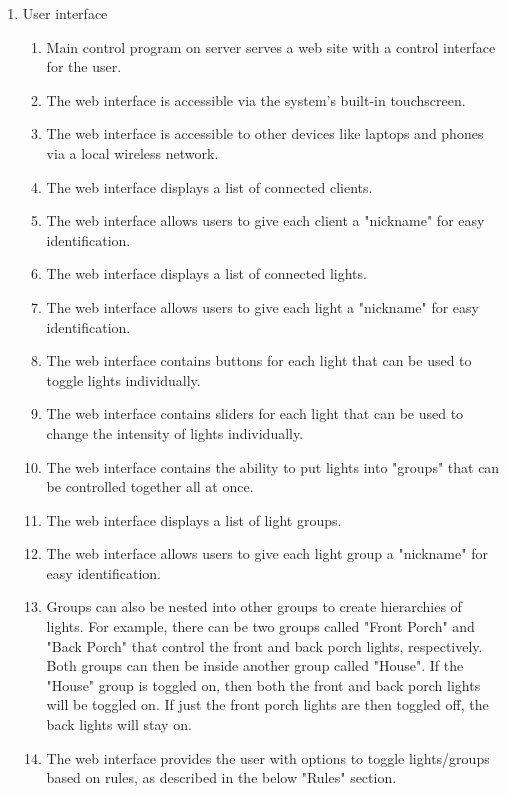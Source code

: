 \documentclass[12pt]{article}
\begin{document}
\begin{enumerate}
    \item User interface
        \begin{enumerate}
            \item Main control program on server serves a web site with a control interface for the user.
            \item The web interface is accessible via the system's built-in touchscreen.
            \item The web interface is accessible to other devices like laptops and phones via a local wireless network.
            \item The web interface displays a list of connected clients.
            \item The web interface allows users to give each client a "nickname" for easy identification.
            \item The web interface displays a list of connected lights.
            \item The web interface allows users to give each light a "nickname" for easy identification.
            \item The web interface contains buttons for each light that can be used to toggle lights individually.
            \item The web interface contains sliders for each light that can be used to change the intensity of lights individually.
            \item The web interface contains the ability to put lights into "groups" that can be controlled together all at once.
            \item The web interface displays a list of light groups.
            \item The web interface allows users to give each light group a "nickname" for easy identification.
            \item Groups can also be nested into other groups to create hierarchies of lights.  For example, there can be two groups called "Front Porch" and "Back Porch" that control the front and back porch lights, respectively.  Both groups can then be inside another group called "House".  If the "House" group is toggled on, then both the front and back porch lights will be toggled on.  If just the front porch lights are then toggled off, the back lights will stay on.
            \item The web interface provides the user with options to toggle lights/groups based on rules, as described in the below "Rules" section.
        \end{enumerate}


\end{enumerate}
\end{document}
